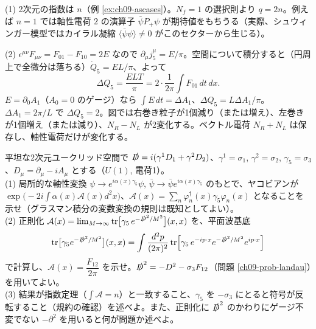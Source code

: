 \begin{solution}
(1) 2次元の指数は $n$（例 \ref{ex:ch09-ascases}）。$N_f=1$ の選択則より $q=2n$。例えば $n=1$ では軸性電荷 $2$ の演算子 $\bar\psi P_+\psi$ が期待値をもちうる（実際、シュウィンガー模型ではカイラル凝縮 $\langle\bar\psi\psi\rangle\ne0$ がこのセクターから生じる）。

(2) $\epsilon^{\mu\nu}F_{\mu\nu}=F_{01}-F_{10}=2E$ なので $\partial_\mu j_5^\mu=E/\pi$。空間について積分すると（円周上で全微分は落ちる）$\dot Q_5=EL/\pi$、よって
\[
\Delta Q_5=\frac{ELT}{\pi}=2\cdot\frac{1}{2\pi}\int F_{01}\,dt\,dx .
\]
$E=\partial_0A_1$（$A_0=0$ のゲージ）なら $\int E\,dt=\Delta A_1$、$\Delta Q_5=L\Delta A_1/\pi$。$\Delta A_1=2\pi/L$ で $\Delta Q_5=2$。図では右巻き粒子が1個減り（または増え）、左巻きが1個増え（または減り）、$N_R-N_L$ が2変化する。ベクトル電荷 $N_R+N_L$ は保存し、軸性電荷だけが変化する。
\end{solution}

\begin{problem}[難易度 C]\label{ch09-prob-fujikawa2d}
平坦な2次元ユークリッド空間で $\slashed D=i(\gamma^1D_1+\gamma^2D_2)$、$\gamma^1=\sigma_1$, $\gamma^2=\sigma_2$, $\gamma_5=\sigma_3$、$D_\mu=\partial_\mu-iA_\mu$ とする（$U(1)$, 電荷1）。\\
(1) 局所的な軸性変換 $\psi\to e^{i\alpha(x)\gamma_5}\psi$, $\bar\psi\to\bar\psi e^{i\alpha(x)\gamma_5}$ のもとで、ヤコビアンが $\exp\bigl(-2i\int\alpha(x)\mathcal A(x)d^2x\bigr)$、$\mathcal A(x)=\sum_n\varphi_n^\dagger(x)\gamma_5\varphi_n(x)$ となることを示せ（グラスマン積分の変数変換の規則は既知としてよい）。\\
(2) 正則化 $\mathcal A(x)=\lim_{M\to\infty}\operatorname{tr}\bigl[\gamma_5\,e^{-\slashed D^2/M^2}\bigr](x,x)$ を、平面波基底
\[
\operatorname{tr}\bigl[\gamma_5e^{-\slashed D^2/M^2}\bigr](x,x)=\int\frac{d^2p}{(2\pi)^2}\operatorname{tr}\Bigl[\gamma_5\,e^{-ip\cdot x}e^{-\slashed D^2/M^2}e^{ip\cdot x}\Bigr]
\]
で計算し、$\mathcal A(x)=\dfrac{F_{12}}{2\pi}$ を示せ。$\slashed D^2=-D^2-\sigma_3F_{12}$（問題 \ref{ch09-prob-landau}）を用いてよい。\\
(3) 結果が指数定理（$\int\mathcal A=n$）と一致すること、$\gamma_5$ を $-\sigma_3$ にとると符号が反転すること（規約の確認）を述べよ。また、正則化に $\slashed D^2$ のかわりにゲージ不変でない $-\partial^2$ を用いると何が問題か述べよ。
\end{problem}

